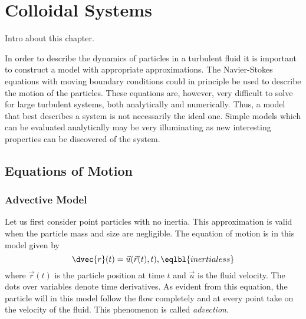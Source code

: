 \chapter{Colloidal Systems}



Intro about this chapter.

In order to describe the dynamics of particles in a turbulent fluid it is important to construct a model with appropriate approximations. The Navier-Stokes equations with moving boundary conditions could in principle be used to describe the motion of the particles. These equations are, however, very difficult to solve for large turbulent systems, both analytically and numerically. Thus, a model that best describes a system is not necessarily the ideal one. Simple models which can be evaluated analytically may be very illuminating as new interesting properties can be discovered of the system. 


\section{Equations of Motion}


\subsection{Advective Model}

Let us first consider point particles with no inertia. This approximation is valid when the particle mass and size are negligible. The equation of motion is in this model given by
\begin{equation}
\dvec{r}(t) = \vec u(\vec{r}(t),t),
\eqlbl{inertialess}
\end{equation}
where $\vec r (t)$ is the particle position at time $t$ and $\vec u $ is the fluid velocity. The dots over variables denote time derivatives. As evident from this equation, the particle will in this model follow the flow completely and at every point take on the velocity of the fluid. This phenomenon is called \emph{advection}.

